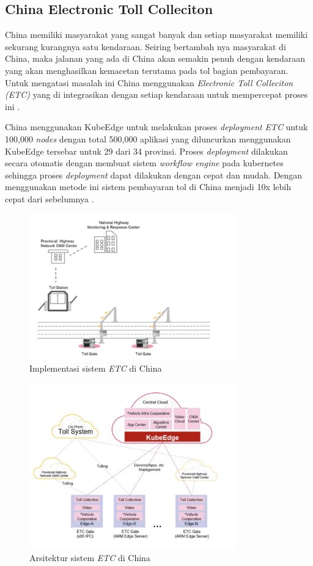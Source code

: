 
\subsection{China Electronic Toll Colleciton}
China memiliki masyarakat yang sangat banyak dan setiap masyarakat memiliki sekurang kurangnya satu kendaraan. Seiring bertambah nya masyarakat di China, maka jalanan yang ada di China akan semakin penuh dengan kendaraan yang akan menghasilkan kemacetan terutama pada tol bagian pembayaran. Untuk mengatasi masalah ini China menggunakan \textit{Electronic Toll Colleciton (ETC)} yang di integrasikan dengan setiap kendaraan untuk mempercepat proses ini \parencite{penelitianterkait1}.

China menggunakan KubeEdge untuk melakukan proses \textit{deployment} \textit{ETC} untuk 100,000 \textit{nodes} dengan total 500,000 aplikasi yang diluncurkan menggunakan KubeEdge tersebar untuk 29 dari 34 provinsi. Proses \textit{deployment} dilakukan secara otomatis dengan membuat sistem \textit{workflow engine} pada kubernetes sehingga proses \textit{deployment} dapat dilakukan dengan cepat dan mudah. Dengan menggunakan metode ini sistem pembayaran tol di China menjadi 10x lebih cepat dari sebelumnya \parencite{penelitianterkait1}.

\begin{figure}[ht]
  \centering
  \includegraphics[width=0.8\textwidth]{resources/chapter-2/china-highways.jpg}
  \caption{Implementasi sistem \textit{ETC} di China \parencite{penelitianterkait1}}
  \label{fig:china-highways}
\end{figure}

\begin{figure}[ht]
  \includegraphics[width=0.8\textwidth]{resources/chapter-2/arsitektur-china-highways.jpg}
  \caption{Arsitektur sistem \textit{ETC} di China \parencite{penelitianterkait1}}
  \label{fig:architecture-china-highways}
\end{figure}